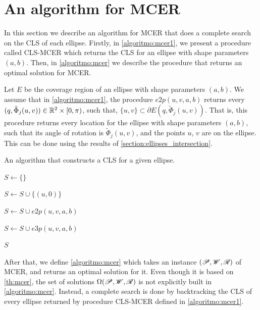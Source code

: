 \section{An algorithm for MCER}

In this section we describe an algorithm for MCER that does a complete search on the CLS of each ellipse.
Firstly, in \autoref{algoritmo:mcer1}, we present a procedure called CLS-MCER which returns the CLS for an ellipse with shape parameters $(a, b)$. Then, in \autoref{algoritmo:mcer} we describe the procedure that returns an optimal solution for MCER.

Let $E$ be the coverage region of an ellipse with shape parameters $(a, b)$. We assume that in \autoref{algoritmo:mcer1}, the procedure $e2p(u, v, a, b)$ returns every $(q, \tilde{\Phi}_j(u,v)) \in \mathbb{R}^2\times[0, \pi)$, such that, $\{u, v\}\subset \partial E(q, \tilde{\Phi}_j(u,v))$. That is, this procedure returns every location for the ellipse with shape parameters $(a, b)$, such that its angle of rotation is $\tilde{\Phi}_j(u,v)$, and the points $u$, $v$ are on the ellipse. This can be done using the results of \autoref{section:ellipses_intersection}.

\begin{algoritmo}
	\caption{An algorithm that constructs a CLS for a given ellipse.}\label{algoritmo:mcer1}
	\begin{algorithmic}[1]
		
		
		\item[]
		
		\State $S \gets \{\}$
		
		\State $S \gets S \cup \{(u, 0)\}$
		\EndFor
		
		\State $S \gets S \cup e2p(u, v, a, b)$
		\EndFor
		
		\State $S \gets S \cup e3p(u, v, a, b)$ 
		\EndFor
		
		\State \Return $S$
		\EndProcedure
	\end{algorithmic}
\end{algoritmo}

After that, we define \autoref{algoritmo:mcer} which takes an instance $(\mathscr{P}, \mathscr{W}, \mathscr{R})$ of MCER, and returns an optimal solution for it.
Even though it is based on \autoref{th:mcer}, the set of solutions $\Omega(\mathscr{P}, \mathscr{W}, \mathscr{R})$ is not explicitly built in \autoref{algoritmo:mcer}. Instead, a complete search is done by backtracking the CLS of every ellipse returned by procedure CLS-MCER defined in \autoref{algoritmo:mcer1}.

